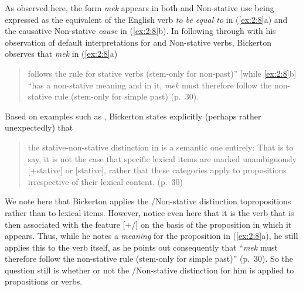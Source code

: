 As observed here, the form \textit{mek} appears in both  and
Non-stative use being expressed as the equivalent of the English
 verb \textit{to be equal to} in (\ref{ex:2:8}a) and the causative
Non-stative \textit{cause} in (\ref{ex:2:8}b).  In following through with his
observation of default  interpretations for  and
Non-stative verbs, Bickerton observes that \textit{mek} in
(\ref{ex:2:8}a)

\begin{quote}
follows the rule for stative verbs (stem-only for non-past)” [while
\ref{ex:2:8}b] ``has a non-stative meaning and in it, \textit{mek}
must therefore follow the non-stative rule (stem-only for simple past)
(p.~30).
\end{quote}

Based on examples such as , Bickerton states explicitly
(perhaps rather unexpectedly) that

\begin{quote}
the stative-non-stative distinction in  is a semantic
one entirely: That is to say, it is not the case that specific lexical
items are marked unambiguously [+stative] or [\textminus stative], rather that
these categories apply to propositions irrespective of their lexical
content. (p.~30)
\end{quote}

We note here that Bickerton applies the \slash Non-stative
distinction to\linebreak propositions rather than to lexical items.  However,
notice even here that it is the verb that is then associated with the
feature [+/\textminus {}] on the basis of the proposition in which it
appears.  Thus, while he notes a  \textit{meaning} for the
proposition in (\ref{ex:2:8}a), he still applies this to the verb
itself, as he points out consequently that ``\textit{mek} must
therefore follow the non-stative rule (stem-only for simple past)”
(p.~30).  So the question still is whether or not the
\slash Non-stative distinction for him is applied to propositions or
verbs.

